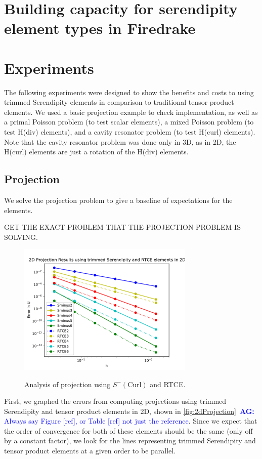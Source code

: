 \documentclass[manuscript,screen]{acmart}
\newcommand{\akg}[1]{\textcolor{blue}{\textbf{AG:} #1}}
\begin{document}
  \section{Building capacity for serendipity element types in Firedrake}

  \section{Experiments}
    
   The following experiments were designed to show the benefits and costs to using trimmed Serendipity elements in comparison to traditional tensor product elements.  We used a basic projection example to check implementation, as well as a primal Poisson problem (to test scalar elements), a mixed Poisson problem (to test H(div) elements), and a cavity resonator problem (to test H(curl) elements).  Note that the cavity resonator problem was done only in 3D, as in 2D, the H(curl) elements are just a rotation of the H(div) elements. 


  \subsection{Projection}
  
  We solve the projection problem to give a baseline of expectations for the elements.  
  
  GET THE EXACT PROBLEM THAT THE PROJECTION PROBLEM IS SOLVING.

  \begin{figure}[h!]
    \caption{Analysis of projection using $S^-(\text{Curl})$ and RTCE.}
    \includegraphics[width=0.75\textwidth]{2dProjectionH.pdf}
    \label{fig:2dProjectionH}
  \end{figure}
  
  \noindent First, we graphed the errors from computing projections using trimmed Serendipity and tensor product elements in 2D, shown in \ref{fig:2dProjection}~\akg{Always say Figure [ref], or Table [ref] not just the reference}.  Since we expect that the order of convergence for both of these elements should be the same (only off by a constant factor), we look for the lines representing trimmed Serendipity and tensor product elements at a given order to be parallel.
\end{document}
